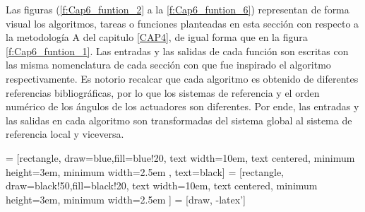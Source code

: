     Las figuras (\ref{f:Cap6_funtion_2} a la \ref{f:Cap6_funtion_6}) representan de forma visual los algoritmos, tareas o funciones planteadas en esta sección con respecto a la  metodología A del capitulo \ref{CAP4}, de igual forma que en la figura \ref{f:Cap6_funtion_1}. Las entradas y las salidas de cada función son escritas con las misma nomenclatura de cada sección con que fue inspirado el algoritmo respectivamente. Es notorio recalcar que cada algoritmo es obtenido de diferentes referencias bibliográficas, por lo que los sistemas de referencia y el orden numérico de los ángulos de los actuadores son diferentes. Por ende, las entradas y las salidas en cada algoritmo son transformadas del sistema global al sistema de referencia local y viceversa.     
    

            \hspace{1cm}


     = [rectangle, draw=blue,fill=blue!20, text width=10em, text centered, minimum height=3em, minimum width=2.5em , text=black]
     = [rectangle, draw=black!50,fill=black!20, text width=10em, text centered, minimum height=3em, minimum width=2.5em ]
     = [draw, -latex']

